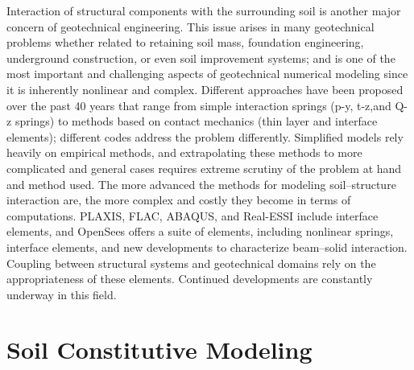 Interaction of structural components with the surrounding soil is another major concern of geotechnical engineering. This issue arises in many geotechnical problems whether related to retaining soil mass, foundation engineering, underground construction, or even soil improvement systems; and is one of the most important and challenging aspects of geotechnical numerical modeling since it is inherently nonlinear and complex. Diﬀerent approaches have been proposed over the past 40 years that range from simple interaction springs (p-y, t-z,and Q-z springs) to methods based on contact mechanics (thin layer and interface elements); different codes address the problem differently. Simpliﬁed models rely heavily on empirical methods, and extrapolating these methods to more complicated and general cases requires extreme scrutiny of the problem at hand and method used. The more advanced the methods for modeling soil–structure interaction are, the more complex and costly they become in terms of computations. PLAXIS, FLAC, ABAQUS, and Real-ESSI include interface elements, and OpenSees offers a suite of elements, including nonlinear springs, interface elements, and new developments to characterize beam–solid interaction. Coupling between structural systems and geotechnical domains rely on the appropriateness of these elements. Continued developments are constantly underway in this field. 

\section{Soil Constitutive Modeling}
\label{sec:resp_geotech_4}

